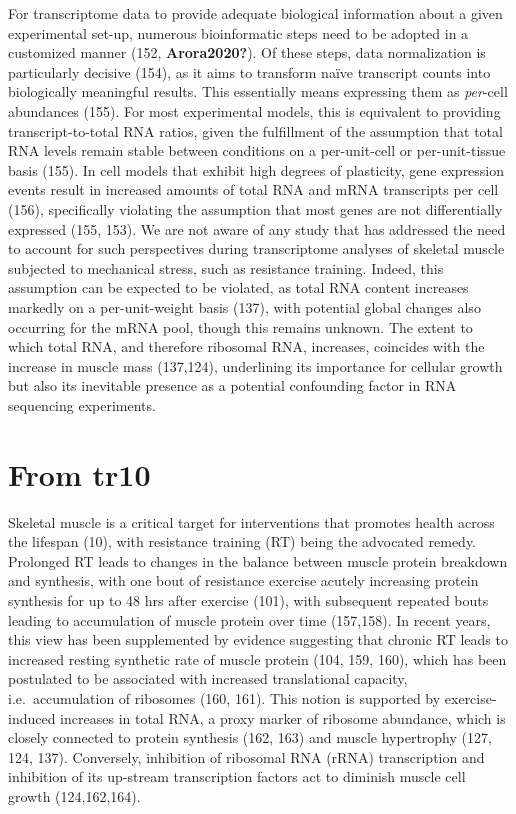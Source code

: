 \documentclass[twoside,10pt]{gihclass} %
\begin{document}
For transcriptome data to provide adequate biological information about a given experimental set-up, numerous bioinformatic steps need to be adopted in a customized manner (152, \textbf{Arora2020?}).
Of these steps, data normalization is particularly decisive (154),
as it aims to transform naïve transcript counts into biologically meaningful results. This essentially means expressing them as \emph{per}-cell abundances (155).
For most experimental models, this is equivalent to providing transcript-to-total RNA ratios, given the fulfillment of the assumption that total RNA levels remain stable between conditions on a per-unit-cell or per-unit-tissue basis (155).
In cell models that exhibit high degrees of plasticity, gene expression events result in increased amounts of total RNA and mRNA transcripts per cell (156), specifically violating the assumption that most genes are not differentially expressed (155, 153).
We are not aware of any study that has addressed the need to account for such perspectives during transcriptome analyses of skeletal muscle subjected to mechanical stress, such as resistance training. Indeed, this assumption can be expected to be violated, as total RNA content increases markedly on a per-unit-weight basis (137), with potential global changes also occurring for the mRNA pool, though this remains unknown. The extent to which total RNA, and therefore ribosomal RNA, increases, coincides with the increase in muscle mass (137,124), underlining its importance for cellular growth but also its inevitable presence as a potential confounding factor in RNA sequencing experiments.

\hypertarget{from-tr10}{%
\section{From tr10}\label{from-tr10}}

Skeletal muscle is a critical target for interventions that promotes health across the lifespan (10),
with resistance training (RT) being the advocated remedy.\\
Prolonged RT leads to changes in the balance between muscle protein breakdown and synthesis, with one bout of resistance exercise acutely increasing protein synthesis for up to 48 hrs after exercise (101),
with subsequent repeated bouts leading to accumulation of muscle protein over time
(157,158).
In recent years, this view has been supplemented by evidence suggesting that chronic RT leads to increased resting synthetic rate of muscle protein
(104, 159, 160),
which has been postulated to be associated with increased translational capacity, i.e.~accumulation of ribosomes
(160, 161).
This notion is supported by exercise-induced increases in total RNA, a proxy marker of ribosome abundance, which is closely connected to protein synthesis
(162, 163)
and muscle hypertrophy
(127, 124, 137).
Conversely, inhibition of ribosomal RNA (rRNA) transcription and inhibition of its up-stream transcription factors act to diminish muscle cell growth
(124,162,164).
\end{document}
